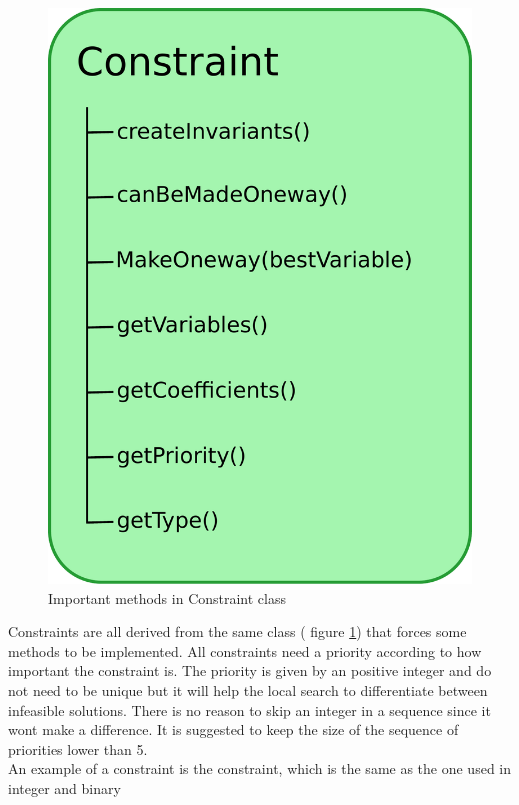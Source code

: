 \begin{figure}[!b]
\centering
\includegraphics[width=\linewidth/2]{constraint.pdf} \caption{Important methods in Constraint 
class}\label{fig_constraint}
\end{figure}
Constraints are all derived from the same class ( figure \ref{fig_constraint}) that forces some 
methods to be implemented. All constraints need a priority according to how important the constraint is. The priority 
is given by an positive integer and do not need to be unique but it will help the local search to differentiate between 
infeasible solutions. There is no reason to skip an integer in a sequence since it wont make a difference. It is 
suggested to keep the size of the sequence of priorities lower than 5. \\
An example of a constraint is the  constraint, which is the same as the one used in integer and binary 
